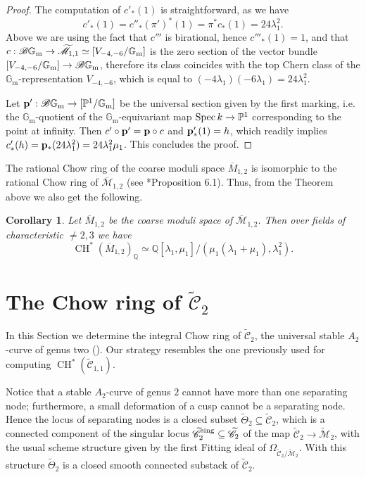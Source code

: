 \documentclass[a4paper, 10pt]{amsart}
\numberwithin{equation}{section}
\numberwithin{subsection}{section}
\newtheorem{corollary}[theorem]{Corollary}
\theoremstyle{definition}
\theoremstyle{remark}
\renewcommand{\mathcal}{\mathscr}
\newcommand\cM{\mathcal{M}} \newcommand\cN{\mathcal{N}}
\newcommand\GG{\mathbb{G}} \newcommand\HH{\mathbb{H}}
\newcommand\rmm{\mathrm{m}} \newcommand\rmn{\mathrm{n}}
\newcommand\spec{\operatorname{Spec}}
\newcommand{\gm}{\GG_{\rmm}}
\newcommand{\Mbar}{\overline{\cM}}
\newcommand{\Mtilde}{\widetilde{\mathcal M}}
\newcommand{\Ctilde}{\widetilde{\mathcal C}}
\newcommand{\ThTilde}{\widetilde{\Theta}}
\newcommand{\sing}{^{\rm sing}}
\newcommand{\ch}[1][*]{\operatorname{CH}^{#1}}
\begin{document}
\begin{proof}
		The computation of $c'_*(1)$ is straightforward, as we have 
		\[c'_*(1)=c''_*(\pi')^*(1)=\pi^*c_*(1)=24\lambda_1^2.\]
		Above we are using the fact that $c'''$ is birational, hence $c'''_*(1)=1$, and that $c:\cB\gm\to\Mtilde_{1,1}\simeq [V_{-4,-6}/\gm]$ is the zero section of the vector bundle $[V_{-4,-6}/\gm]\to\cB\gm$, therefore its class coincides with the top Chern class of the $\gm$-representation $V_{-4,-6}$, which is equal to $(-4\lambda_1)(-6\lambda_1)=24\lambda_1^2$.
		
		Let $\bfp':\cB\gm\to [\PP^1/\gm]$ be the universal section given by the first marking, i.e. the $\gm$-quotient of the $\gm$-equivariant map $\spec{k}\to\PP^1$ corresponding to the point at infinity. Then $c'\circ \mathbf{p} ' = \mathbf{p} \circ c$ and $\mathbf{p}'_*(1)=h$, which readily implies $c'_*(h)=\mathbf{p}_*(24\lambda_1^2)=24\lambda_1^2\mu_1$. This concludes the proof.
	\end{proof}
	The rational Chow ring of the coarse moduli space $\overline{M}_{1,2}$ is isomorphic to the rational Chow ring of $\Mbar_{1,2}$ (see \cite{VisInt}*{Proposition 6.1}). Thus, from the Theorem above we also get the following.
	\begin{corollary}\label{cor:chow Mbar12}
		Let $\overline{M}_{1,2}$ be the coarse moduli space of $\Mbar_{1,2}$. Then over fields of characteristic $\neq 2,3$ we have
		\[ \ch(\overline{M}_{1,2})_{\mathbb{Q}} \simeq \mathbb{Q}[\lambda_1,\mu_1]/(\mu_1(\lambda_1+\mu_1),\lambda_1^2). \]
	\end{corollary}
	
	\section{The Chow ring of $\Ctilde_2$}\label{sec:chow cusp}
	In this Section we determine the integral Chow ring of $\Ctilde_2$, the universal stable $A_2$-curve of genus two (). Our strategy resembles the one previously used for computing $\ch(\Ctilde_{1,1})$.
	
	Notice that a stable $A_{2}$-curve of genus $2$ cannot have more than one separating node; furthermore, a small deformation of a cusp cannot be a separating node. Hence the locus of separating nodes is a closed subset $\ThTilde_{2} \subseteq\Ctilde_{2}$, which is a connected component of the singular locus $\Ctilde_{2}\sing \subseteq \Ctilde_{2}$ of the map $\Ctilde_2\to\Mtilde_2$, with the usual scheme structure given by the first Fitting ideal of $\Omega_{\Ctilde_{2}/\Mtilde_{2}}$. With this structure $\ThTilde_{2}$ is a closed smooth connected substack of $\Ctilde_{2}$.
	
\end{document}
